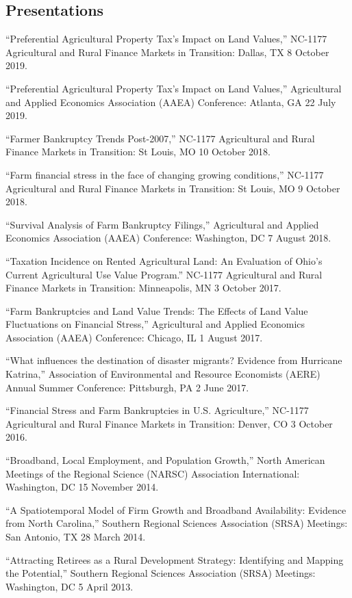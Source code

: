 \documentclass[letterpaper]{article}
\renewenvironment{itemize}{
  \begin{list}{}{
    \setlength{\leftmargin}{1.5em}
  }
}{
  \end{list}
}
\begin{document}
\subsection*{Presentations}

\begin{itemize}
\item ``Preferential Agricultural Property Tax's Impact on Land Values,'' NC-1177 Agricultural and Rural Finance Markets in Transition: Dallas, TX 8 October 2019.
\item ``Preferential Agricultural Property Tax's Impact on Land Values,'' Agricultural and Applied Economics Association (AAEA) Conference: Atlanta, GA 22 July 2019.
\item ``Farmer Bankruptcy Trends Post-2007,'' NC-1177 Agricultural and Rural Finance Markets in Transition: St Louis, MO 10 October 2018.
\item ``Farm financial stress in the face of changing growing conditions,'' NC-1177 Agricultural and Rural Finance Markets in Transition: St Louis, MO 9 October 2018.
\item ``Survival Analysis of Farm Bankruptcy Filings,'' Agricultural and Applied Economics Association (AAEA) Conference: Washington, DC 7 August 2018.
\item ``Taxation Incidence on Rented Agricultural Land: An Evaluation of Ohio's Current Agricultural Use Value Program.'' NC-1177 Agricultural and Rural Finance Markets in Transition: Minneapolis, MN 3 October 2017.
\item ``Farm Bankruptcies and Land Value Trends: The Effects of Land Value Fluctuations on Financial Stress,'' Agricultural and Applied Economics Association (AAEA) Conference: Chicago, IL 1 August 2017.
\item ``What influences the destination of disaster migrants? Evidence from Hurricane Katrina,'' Association of Environmental and Resource Economists (AERE) Annual Summer Conference: Pittsburgh, PA 2 June 2017.
\item ``Financial Stress and Farm Bankruptcies in U.S. Agriculture,'' NC-1177 Agricultural and Rural Finance Markets in Transition: Denver, CO 3 October 2016.
\item ``Broadband, Local Employment, and Population Growth,'' North American Meetings of the Regional Science (NARSC) Association International: Washington, DC 15 November 2014.
\item ``A Spatiotemporal Model of Firm Growth and Broadband Availability: Evidence from North Carolina,'' Southern Regional Sciences Association (SRSA) Meetings: San Antonio, TX 28 March 2014.
\item ``Attracting Retirees as a Rural Development Strategy: Identifying and Mapping the Potential,'' Southern Regional Sciences Association (SRSA) Meetings: Washington, DC 5 April 2013.
\end{itemize}
\end{document}
